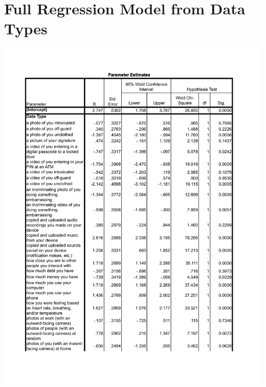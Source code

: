 
\onecolumn
\section{Full Regression Model from Data Types}
\label{sec:regression-apx}
\includegraphics[page=1,scale=0.8]{images/full-model.pdf}



